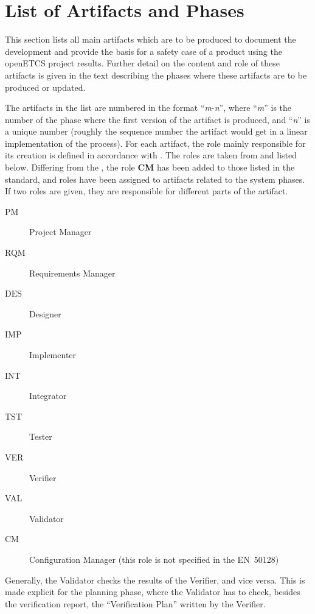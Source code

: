 \documentclass{template/openetcs_article}
\begin{document}
\section{List of Artifacts and Phases}
\label{sec:list-artifacts}
This section lists all main artifacts which are to be produced to
document the development and provide the basis for a safety case of a
product using the openETCS project results. Further detail on the
content and role of these artifacts is given in the text describing
the phases where these artifacts are to be produced or updated.

The artifacts in the list are numbered in the format
``\textit{m}-\textit{n}'', where ``\textit{m}'' is the number of the
phase where the first version of the artifact is produced, and
``\textit{n}'' is a unique number (roughly the sequence number the
artifact would get in a linear implementation of the process). For
each artifact, the role mainly responsible for its creation is defined
in accordance with \cite[Tab.~C.1]{EN50128:2011}. The roles are taken
from \cite[Sec.~5.1 / Fig.~2]{EN50128:2011} and listed
below. Differing from the \cite{EN50128:2011}, the role \textbf{CM}
has been added to those listed in the standard, and roles have been
assigned to artifacts related to the system phases. If two roles are
given, they are responsible for different parts of the artifact.
%
\begin{description}
\item[PM] Project Manager
\item[RQM] Requirements Manager
\item[DES] Designer
\item[IMP] Implementer
\item[INT] Integrator
\item[TST] Tester
\item[VER] Verifier
\item[VAL] Validator
\item[CM] Configuration Manager (this role is not specified in the EN~50128)
\end{description}
%
%
Generally, the Validator checks the results of the Verifier, and vice
versa. This is made explicit for the planning phase, where the
Validator has to check, besides the verification report, the
``Verification Plan'' written by the Verifier.
%
\end{document}
